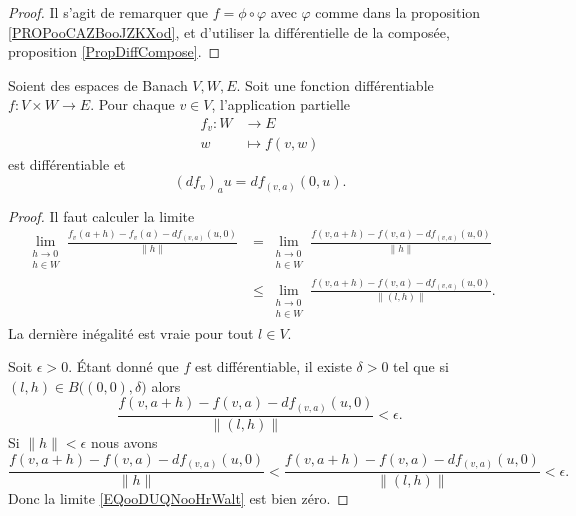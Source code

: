 \begin{proof}
	Il s'agit de remarquer que \( f=\phi\circ \varphi\) avec \( \varphi\) comme dans la proposition \ref{PROPooCAZBooJZKXod}, et d'utiliser la différentielle de la composée, proposition \ref{PropDiffCompose}.
\end{proof}


\begin{proposition}	\label{PROPooBEYNooJlrFTC}
	Soient des espaces de Banach \( V,W,E\). Soit une fonction différentiable \(f \colon V\times W\to E  \). Pour chaque \( v\in V\), l'application partielle
	\begin{equation}
		\begin{aligned}
			f_v\colon W & \to E             \\
			w           & \mapsto    f(v,w)
		\end{aligned}
	\end{equation}
	est différentiable et
	\begin{equation}
		(df_v)_au=df_{(v,a)}(0,u).
	\end{equation}
\end{proposition}


\begin{proof}
	Il faut calculer la limite
	\begin{subequations}		\label{EQooDUQNooHrWalt}
		\begin{align}
			\lim_{\substack{ h\to 0        \\ h\in W }  }\frac{ f_v(a+h)-f_v(a)-df_{(v,a)}(u,0) }{ \| h \| }&= \lim_{\substack{ h\to 0 \\ h\in W }  }\frac{ f(v,a+h)-f(v,a)-df_{(v,a)}(u,0) }{ \| h \| }\\
			 & \leq\lim_{\substack{ h\to 0 \\ h\in W }  }\frac{ f(v,a+h)-f(v,a)-df_{(v,a)}(u,0) }{ \| (l,h) \| }.
		\end{align}
	\end{subequations}
	La dernière inégalité est vraie pour tout \( l\in V\).

	Soit \( \epsilon>0\). Étant donné que \( f\) est différentiable, il existe \( \delta>0\) tel que si \( (l,h)\in B\big( (0,0),\delta \big)\) alors
	\begin{equation}
		\frac{	f(v,a+h)-f(v,a)-df_{(v,a)}(u,0) }{ \| (l,h) \| }<\epsilon.
	\end{equation}
	Si \( \| h \|<\epsilon\) nous avons
	\begin{equation}
		\frac{	f(v,a+h)-f(v,a)-df_{(v,a)}(u,0) }{ \| h \|} < \frac{	f(v,a+h)-f(v,a)-df_{(v,a)}(u,0) }{ \| (l,h) \|} <\epsilon.
	\end{equation}
	Donc la limite \eqref{EQooDUQNooHrWalt} est bien zéro.
\end{proof}


